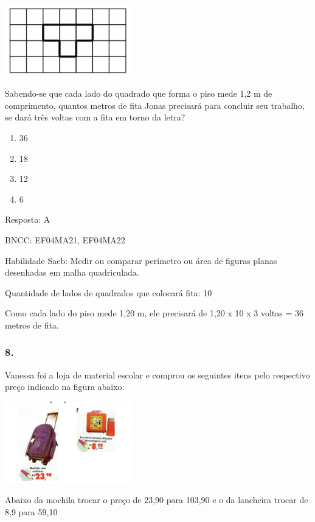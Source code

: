 \includegraphics[width=2.17519in,height=1.22511in]{media/image155.png}

Sabendo-se que cada lado do quadrado que forma o piso mede 1,2 m de
comprimento, quantos metros de fita Jonas precisará para concluir seu
trabalho, se dará três voltas com a fita em torno da letra?

\begin{enumerate}
\def\labelenumi{\alph{enumi})}
\item
  36
\item
  18
\item
  12
\item
  6
\end{enumerate}

Resposta: A

BNCC: EF04MA21, EF04MA22

Habilidade Saeb: Medir ou comparar perímetro ou área de figuras planas
desenhadas em malha quadriculada.

Quantidade de lados de quadrados que colocará fita: 10

Como cada lado do piso mede 1,20 m, ele precisará de 1,20 x 10 x 3
voltas = 36 metros de fita.

\subsubsection{8.}\label{section-164}

Vanessa foi a loja de material escolar e comprou os seguintes itens pelo
respectivo preço indicado na figura abaixo:

\includegraphics[width=2.17519in,height=1.39179in]{media/image156.png}

Abaixo da mochila trocar o preço de 23,90 para 103,90 e o da lancheira
trocar de 8,9 para 59,10

